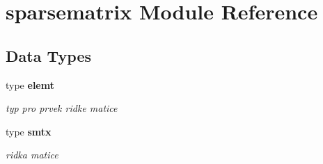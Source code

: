 \section{sparsematrix Module Reference}
\label{namespacesparsematrix}
\subsection*{Data Types}
\begin{DoxyCompactItemize}
\item 
type {\bf elemt}
\begin{DoxyCompactList}\small\item\em typ pro prvek ridke matice \end{DoxyCompactList}\item 
type {\bf smtx}
\begin{DoxyCompactList}\small\item\em ridka matice \end{DoxyCompactList}\end{DoxyCompactItemize}
